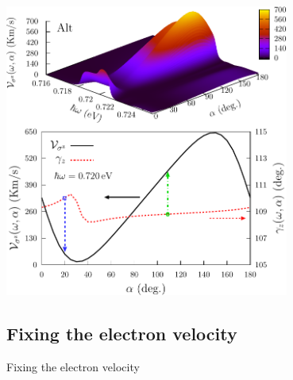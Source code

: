 \documentclass{beamer}
\begin{document}

\begin{frame}

\begin{center}
\includegraphics[width=0.7\textwidth]{figs/fig6.pdf}
\end{center}  

\end{frame}



\subsection{Fixing the electron velocity}

\begin{frame}

Fixing the electron velocity

{\small


}

\end{frame}

\end{document}
